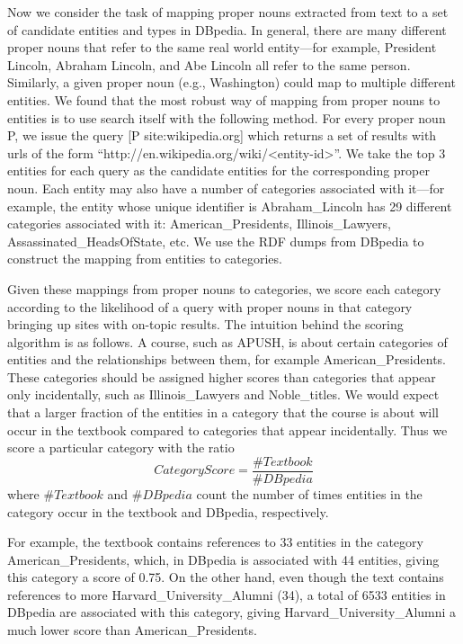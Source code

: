 \documentclass[pdfpagelabels=false,plainpages=true]{acm_proc_article-sp}
\begin{document}
Now we consider the task of mapping proper nouns extracted from text
to a set of candidate entities and types in DBpedia. In general, there are many
different proper nouns that refer to the same real world entity---for example,
President Lincoln, Abraham Lincoln, and Abe Lincoln all refer to the same 
person. Similarly, a given proper noun (e.g., Washington) could map to multiple
different entities. We found that the most robust way of mapping from proper
nouns to entities is to use search itself with the following method. For every
proper noun P, we issue the query [P site:wikipedia.org] which returns a set of
results with urls of the form ``http://\-en.wikipedia.org/wiki/<entity-id>''. We take
the top 3 entities for each query as the candidate entities for the corresponding
proper noun. Each entity may also have a number of categories associated with it---for  
example, the entity whose unique identifier is Abraham\_Lincoln has 29
different categories associated with it: American\_Presidents,
Illinois\_Lawyers, Assassinated\_HeadsOfState, etc. We use the RDF dumps from
DBpedia to construct the mapping from entities to categories.


Given these mappings from proper nouns to categories, we score each category
according to the likelihood of a query with proper nouns in that category
bringing up sites with on-topic results. The intuition behind the
scoring algorithm is as follows. A course, such as APUSH, is about certain
categories of entities and the relationships between them, for example
American\_Presidents. These categories should be assigned higher scores than
categories that appear only incidentally, such as Illinois\_Lawyers and
Noble\_titles. We would expect that a larger fraction of the entities in a
category that the course is about will occur in the textbook compared to
categories that appear incidentally. Thus we score a particular category with
the ratio
\begin{equation}
CategoryScore = \frac{\#Textbook}{\#DBpedia}
\end{equation}
where $\#Textbook$ and $\#DBpedia$ count the number of times entities in
the category occur in the textbook and DBpedia, respectively.

For example, the textbook contains references to 33 entities in the category
American\_Presidents, which, in DBpedia is associated with 44 entities, giving
this category a score of 0.75. On the other hand, even though the text contains
references to more Harvard\_University\_Alumni (34), a total of 6533 entities in
DBpedia are associated with this category, giving Harvard\_University\_Alumni a
much lower score than American\_Presidents. 
\end{document}
